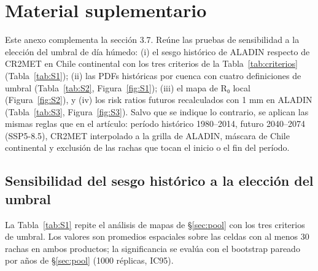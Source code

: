 \chapter{Material suplementario}\label{anx:A}

Este anexo complementa la sección 3.7. Reúne las pruebas de sensibilidad a la elección del umbral de día húmedo: (i) el sesgo histórico de ALADIN respecto de CR2MET en Chile continental con los tres criterios de la Tabla~\ref{tab:criterios} (Tabla~\ref{tab:S1}); (ii) las PDFs históricas por cuenca con cuatro definiciones de umbral (Tabla~\ref{tab:S2}, Figura~\ref{fig:S1}); (iii) el mapa de R₀ local (Figura~\ref{fig:S2}), y (iv) los risk ratios futuros recalculados con 1 mm en ALADIN (Tabla~\ref{tab:S3}, Figura~\ref{fig:S3}). Salvo que se indique lo contrario, se aplican las mismas reglas que en el artículo: período histórico 1980--2014, futuro 2040--2074 (SSP5-8.5), CR2MET interpolado a la grilla de ALADIN, máscara de Chile continental y exclusión de las rachas que tocan el inicio o el fin del período.

\section{Sensibilidad del sesgo histórico a la elección del umbral}\label{sec:S1}

La Tabla~\ref{tab:S1} repite el análisis de mapas de §\ref{sec:pool} con los tres criterios de umbral. Los valores son promedios espaciales sobre las celdas con al menos 30 rachas en ambos productos; la significancia se evalúa con el bootstrap pareado por años de §\ref{sec:pool} (1000 réplicas, IC95).

